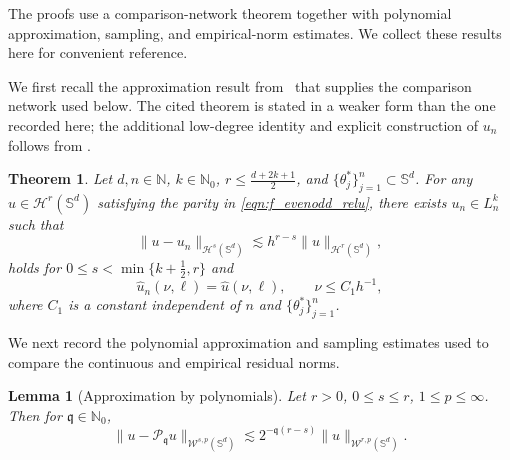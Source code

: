 \documentclass{article}
\numberwithin{equation}{section}
\newtheorem{theorem}{Theorem}
\newtheorem{lemma}{Lemma}
\def\NN{\mathbb{N}}
\def\SS{\mathbb{S}}
\def\mq{\mathfrak{q}}
\def\mP{\mathcal{P}}
\begin{document}
The proofs use a comparison-network theorem together with polynomial approximation, sampling, and empirical-norm estimates. We collect these results here for convenient reference.

We first recall the approximation result from~\cite{liu2025integral} that supplies the comparison network used below. The cited theorem is stated in a weaker form than the one recorded here; the additional low-degree identity and explicit construction of $u_n$ follows from \cite[(4.12)--(4.13)]{liu2025integral}.

\begin{theorem}\label{thm:main_sphere}
Let $d,n\in\NN$, $k\in\NN_0$, $r\leq\frac{d+2k+1}{2}$, and $\{\theta_j^*\}_{j=1}^n\subset\SS^d$. For any $u\in\mathcal H^r(\SS^d)$ satisfying the parity in \eqref{eqn:f_evenodd_relu}, there exists $u_n\in L_n^k$ such that
\begin{equation}
\|u-u_n\|_{\mathcal H^s(\SS^d)}\lesssim h^{r-s}\|u\|_{\mathcal H^r(\SS^d)},
\end{equation}
holds for $0\leq s<\min\{k+\frac12,r\}$ and
\begin{equation}\label{eqn:trunc_equal}
\widehat u_n(\nu,\ell)=\widehat u(\nu,\ell),\qquad \nu\leq C_1 h^{-1},
\end{equation}
where $C_1$ is a constant independent of $n$ and $\{\theta_j^*\}_{j=1}^n$.
\end{theorem}

We next record the polynomial approximation and sampling estimates used to compare the continuous and empirical residual norms.



\begin{lemma}[Approximation by polynomials]\label{lem_sharp_appr_poly}
    Let $r>0$, $0\leq s\leq r$, $1\leq p\leq\infty$. Then for $\mq\in\NN_0$,
    \begin{equation}\label{eqn_sharp_appr_poly}
        \|u-\mP_\mq u\|_{\mathcal W^{s,p}(\SS^d)}\lesssim2^{-\mq (r-s)}\|u\|_{\mathcal{W}^{r,p}(\SS^d)}.
    \end{equation}
\end{lemma}
\end{document}
